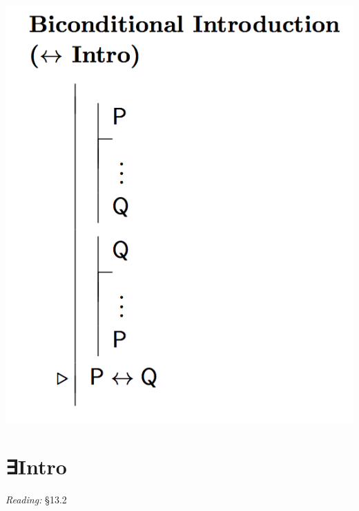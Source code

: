 \documentclass[12pt]{extarticle}
\begin{document}
\begin{multicols*}{3}
\begin{center}
\includegraphics[scale=0.3]{img/rule_biconditional_intro.png}
\end{center}
 
 \columnbreak
 
\section{∃Intro}
 
\emph{Reading:} §13.2
 

\end{multicols*}
\end{document}
